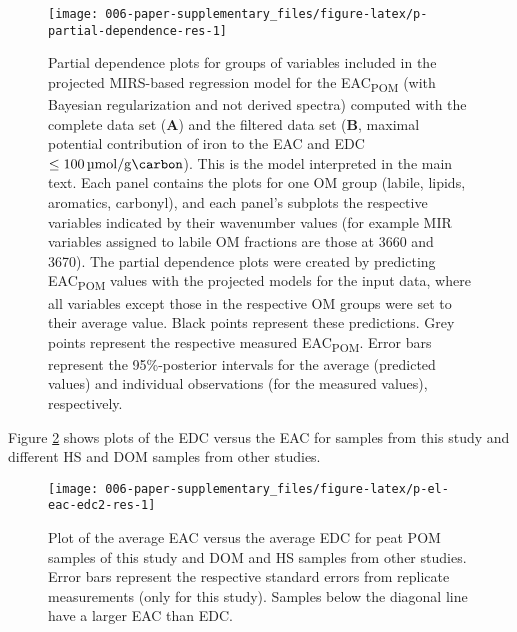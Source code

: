 \documentclass[draft,linenumbers]{agujournal2018}
\begin{document}
\begin{figure}[H]

{\centering \texttt{[image: 006-paper-supplementary\_files/figure-latex/p-partial-dependence-res-1]} 

}

\caption{Partial dependence plots for groups of variables included in the projected MIRS-based regression model for the EAC\textsubscript{POM} (with Bayesian regularization and not derived spectra) computed with the complete data set (\textbf{A}) and the filtered data set (\textbf{B}, maximal potential contribution of iron to the EAC and EDC $\le\SI{100}{\micro\mol\per\gram\carbon}$). This is the model interpreted in the main text. Each panel contains the plots for one OM group (labile, lipids, aromatics, carbonyl), and each panel's subplots the respective variables indicated by their wavenumber values (for example MIR variables assigned to labile OM fractions are those at 3660 and \SI{3670}{\wn}). The partial dependence plots were created by predicting EAC\textsubscript{POM} values with the projected models for the input data, where all variables except those in the respective OM groups were set to their average value. Black points represent these predictions. Grey points represent the respective measured EAC\textsubscript{POM}. Error bars represent the 95\%-posterior intervals for the average (predicted values) and individual observations (for the measured values), respectively.}\label{fig:p-partial-dependence-res}
\end{figure}

\clearpage

Figure \ref{fig:p-el-eac-edc2-res} shows plots of the EDC versus the EAC
for samples from this study and different HS and DOM samples from other
studies.

\begin{figure}[H]

{\centering \texttt{[image: 006-paper-supplementary\_files/figure-latex/p-el-eac-edc2-res-1]} 

}

\caption{Plot of the average EAC versus the average EDC for peat POM samples of this study and DOM and HS samples from other studies. Error bars represent the respective standard errors from replicate measurements (only for this study). Samples below the diagonal line have a larger EAC than EDC.}\label{fig:p-el-eac-edc2-res}
\end{figure}
\end{document}
